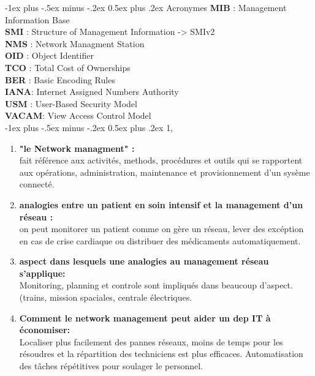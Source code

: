 \documentclass[12pt,landscape]{article}
\makeatletter
\renewcommand{\section}{\@startsection{section}{1}{0mm}%
                                {-1ex plus -.5ex minus -.2ex}%
                                {0.5ex plus .2ex}%
                                {\normalfont\large\bfseries}}
\makeatother
\begin{document}
\begin{multicols}{2}
\section{Acronymes}
\textbf{MIB} : Management Information Base\\
\textbf{SMI} : Structure of Management Information -> SMIv2\\
\textbf{NMS} : Network Managment Station\\
\textbf{OID} : Object Identifier\\
\textbf{TCO} : Total Cost of Ownerships\\
\textbf{BER} : Basic Encoding Rules\\
\textbf{IANA}: Internet Assigned Numbers Authority\\
\textbf{USM} : User-Based Security Model\\
\textbf{VACAM}: View Access Control Model\\


\section{1,}
\begin{enumerate}
\item \textbf{"le Network managment" :}\\
fait référence aux activités, methods, procédures et outils qui se rapportent aux opérations, administration, maintenance et provisionnement d'un sysème connecté.

\item \textbf{analogies entre un patient en soin intensif et la management d'un réseau :}\\
on peut monitorer un patient comme on gère un réseau, lever des excéption en cas de crise cardiaque ou distribuer des médicaments automatiquement.

\item \textbf{aspect dans lesquels une analogies au management réseau s'applique:}\\
Monitoring, planning et controle sont impliqués dans beaucoup d'aspect.(trains, mission spaciales, centrale électriques.

\item \textbf{Comment le network management peut aider un dep IT à économiser:}\\
Localiser plus facilement des pannes réseaux, moins de temps pour les résoudres et la répartition des techniciens est plus efficaces. Automatisation des tâches répétitives pour soulager le personnel.


\end{enumerate}
\end{multicols}
\end{document}
